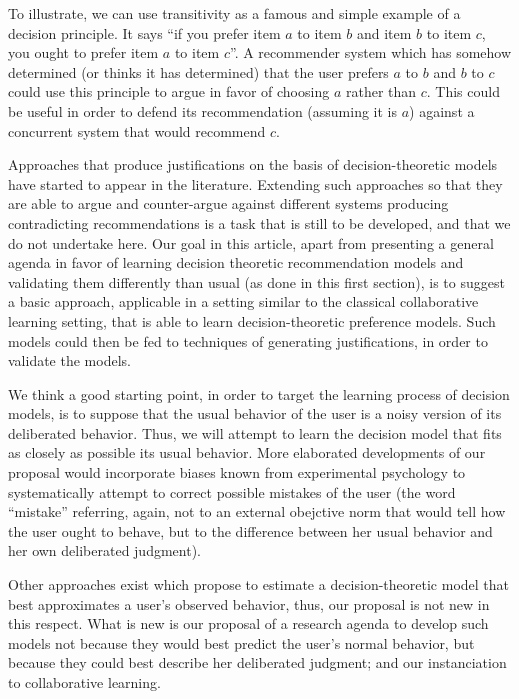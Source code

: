 \documentclass[version=last, pagesize, twoside=off, bibliography=totoc, DIV=calc, fontsize=14pt, a4paper, french, english]{scrartcl}
\begin{document}
To illustrate, we can use transitivity as a famous and simple example of a decision principle. It says “if you prefer item $a$ to item $b$ and item $b$ to item $c$, you ought to prefer item $a$ to item $c$”. A recommender system which has somehow determined (or thinks it has determined) that the user prefers $a$ to $b$ and $b$ to $c$ could use this principle to argue in favor of choosing $a$ rather than $c$. This could be useful in order to defend its recommendation (assuming it is $a$) against a concurrent system that would recommend $c$.

Approaches that produce justifications on the basis of decision-theoretic models have started to appear in the literature. Extending such approaches so that they are able to argue and counter-argue against different systems producing contradicting recommendations is a task that is still to be developed, and that we do not undertake here. Our goal in this article, apart from presenting a general agenda in favor of learning decision theoretic recommendation models and validating them differently than usual (as done in this first section), is to suggest a basic approach, applicable in a setting similar to the classical collaborative learning setting, that is able to learn decision-theoretic preference models. Such models could then be fed to techniques of generating justifications, in order to validate the models.

We think a good starting point, in order to target the learning process of decision models, is to suppose that the usual behavior of the user is a noisy version of its deliberated behavior. Thus, we will attempt to learn the decision model that fits as closely as possible its usual behavior. More elaborated developments of our proposal would incorporate biases known from experimental psychology to systematically attempt to correct possible mistakes of the user (the word “mistake” referring, again, not to an external obejctive norm that would tell how the user ought to behave, but to the difference between her usual behavior and her own deliberated judgment).

Other approaches exist which propose to estimate a decision-theoretic model that best approximates a user’s observed behavior, thus, our proposal is not new in this respect. What is new is our proposal of a research agenda to develop such models not because they would best predict the user’s normal behavior, but because they could best describe her deliberated judgment; and our instanciation to collaborative learning.
\end{document}
